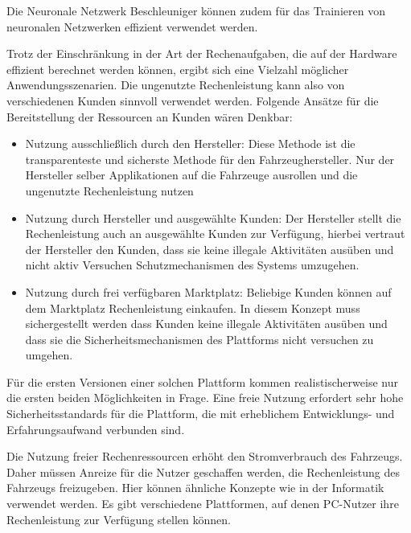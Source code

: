 Die Neuronale Netzwerk Beschleuniger können zudem für das Trainieren von neuronalen Netzwerken effizient verwendet werden. 

Trotz der Einschränkung in der Art der Rechenaufgaben, die auf der Hardware effizient berechnet werden können, ergibt sich eine Vielzahl möglicher Anwendungsszenarien. Die ungenutzte Rechenleistung kann also von verschiedenen Kunden sinnvoll verwendet werden. Folgende Ansätze für die Bereitstellung der Ressourcen an Kunden wären Denkbar:

\begin{itemize}
    \item Nutzung ausschließlich durch den Hersteller: Diese Methode ist die transparenteste und sicherste Methode für den Fahrzeughersteller. Nur der Hersteller selber Applikationen auf die Fahrzeuge ausrollen und die ungenutzte Rechenleistung nutzen
    \item Nutzung durch Hersteller und ausgewählte Kunden: Der Hersteller stellt die Rechenleistung auch an ausgewählte Kunden zur Verfügung, hierbei vertraut der Hersteller den Kunden, dass sie keine illegale Aktivitäten ausüben und nicht aktiv Versuchen Schutzmechanismen des Systems umzugehen.
    \item Nutzung durch frei verfügbaren Marktplatz: Beliebige Kunden können auf dem Marktplatz Rechenleistung einkaufen. In diesem Konzept muss sichergestellt werden dass Kunden keine illegale Aktivitäten ausüben und dass sie die Sicherheitsmechanismen des Plattforms nicht versuchen zu umgehen.
\end{itemize}

Für die ersten Versionen einer solchen Plattform kommen realistischerweise nur die ersten beiden Möglichkeiten in Frage. Eine freie Nutzung erfordert sehr hohe Sicherheitsstandards für die Plattform, die mit erheblichem Entwicklungs- und Erfahrungsaufwand verbunden sind. 

Die Nutzung freier Rechenressourcen erhöht den Stromverbrauch des Fahrzeugs. Daher müssen Anreize für die Nutzer geschaffen werden, die Rechenleistung des Fahrzeugs freizugeben. Hier können ähnliche Konzepte wie in der Informatik verwendet werden. Es gibt verschiedene Plattformen, auf denen PC-Nutzer ihre Rechenleistung zur Verfügung stellen können. 

